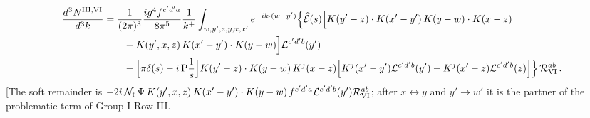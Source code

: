 {\color{red}
\begin{align}
\frac{d^{3}N^{\rm III,VI}}{d^{3}k}&=\frac{1}{(2\pi)^{3}}\frac{ig^{4}f^{c'd'a}}{8\pi^{5}}\frac{1}{k^{+}}\int_{w,y',z,y,x,x'}e^{-ik\cdot(w-y')}\Big\{\widehat{\mathcal{E}}(s)\Big[K(y'-z)\cdot K(x'-y')\,K(y-w)\cdot K(x-z)\notag\\&\qquad-K(y',x,z)\,K(x'-y')\cdot K(y-w)\Big]\mathcal{L}^{c'd'b}(y')\notag\\
&\qquad-\Big[\pi\delta(s)-i\,{\rm P}\frac1s\Big]K(y'-z)\cdot K(y-w)\,K^{j}(x-z)\Big[K^{j}(x'-y')\mathcal{L}^{c'd'b}(y')-K^{j}(x'-z)\mathcal{L}^{c'd'b}(z)\Big]\Big\}\,\mathcal{R}_{\rm VI}^{ab}\,.\label{eq:fx-G3R6}
\end{align}
{\color{red}[The soft remainder is $-2i\,\mathcal{N}_{\rm f}\,\Psi\,K(y',x,z)\,K(x'-y')\cdot K(y-w)\,f^{c'd'a}\mathcal{L}^{c'd'b}(y')\mathcal{R}_{\rm VI}^{ab}$; after $x\leftrightarrow y$ and $y'\to w'$ it is the partner of the problematic term of Group I Row III.]}}\par

